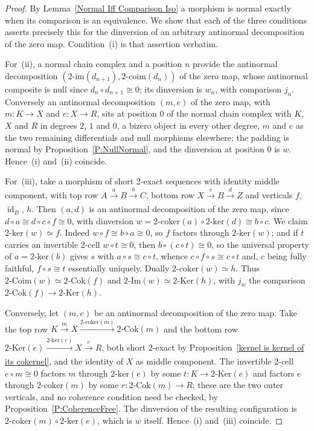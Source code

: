 \documentclass[reqno,a4paper]{amsart}
\numberwithin{equation}{section}
\theoremstyle{plain}
\theoremstyle{definition}
\def\nameit#1{\textrm{#1}~}
\def\prox{\nameit{Proposition}}
\def\lemx{\nameit{Lemma}}
\newcommand{\comp}{\circ}
\newcommand{\iso}{\cong}
\renewcommand{\1}{\onecat{1}}
\newcommand{\TwoKer}{\ensuremath{2\text{-}\mathrm{Ker}}}
\newcommand{\TwoCoker}{\ensuremath{2\text{-}\mathrm{Cok}}}
\newcommand{\twoker}{\ensuremath{2\text{-}\mathrm{ker}}}
\newcommand{\twocoker}{\ensuremath{2\text{-}\mathrm{coker}}}
\newcommand{\TwoImg}{\ensuremath{2\text{-}\mathrm{Im}}}
\newcommand{\twoimg}{\ensuremath{2\text{-}\mathrm{im}}}
\newcommand{\TwoCoim}{\ensuremath{2\text{-}\mathrm{Coim}}}
\newcommand{\twocoim}{\ensuremath{2\text{-}\mathrm{coim}}}
\newcommand{\id}[1]{\operatorname{id}_{#1}}
\newcommand{\aar}[2][]{\xrightarrow[#1]{#2}}
\begin{document}
\begin{proof}
	By \lemx\ref{Normal Iff Comparison Iso} a morphism is normal exactly when its comparison is an equivalence. We show that each of the three conditions asserts precisely this for the dinversion of an arbitrary antinormal decomposition of the zero map. Condition~(i) is that assertion verbatim.

	For~(ii), a normal chain complex and a position \(n\) provide the antinormal decomposition \((\twoimg(d_{n+1}),\twocoim(d_n))\) of the zero map, whose antinormal composite is null since \(d_n\comp d_{n+1}\iso 0\); its dinversion is \(w_n\), with comparison \(j_n\). Conversely an antinormal decomposition \((m,e)\) of the zero map, with \(m\colon K\to X\) and \(e\colon X\to R\), sits at position \(0\) of the normal chain complex with \(K\), \(X\) and \(R\) in degrees \(2\), \(1\) and \(0\), a bizero object in every other degree, \(m\) and \(e\) as the two remaining differentials and null morphisms elsewhere; the padding is normal by \prox\ref{P:NullNormal}, and the dinversion at position \(0\) is \(w\). Hence~(i) and~(ii) coincide.

	For~(iii), take a morphism of short 2-exact sequences with identity middle component, with top row \(A\aar{a}B\aar{b}C\), bottom row \(X\aar{c}B\aar{d}Z\) and verticals \(f\), \(\id{B}\), \(h\). Then \((a,d)\) is an antinormal decomposition of the zero map, since \(d\comp a\iso d\comp c\comp f\iso 0\), with dinversion \(w=\twocoker(a)\comp\twoker(d)\iso b\comp c\). We claim \(\twoker(w)\simeq f\). Indeed \(w\comp f\iso b\comp a\iso 0\), so \(f\) factors through \(\twoker(w)\); and if \(t\) carries an invertible 2-cell \(w\comp t\iso 0\), then \(b\comp(c\comp t)\iso 0\), so the universal property of \(a=\twoker(b)\) gives \(s\) with \(a\comp s\iso c\comp t\), whence \(c\comp f\comp s\iso c\comp t\) and, \(c\) being fully faithful, \(f\comp s\iso t\) essentially uniquely. Dually \(\twocoker(w)\simeq h\). Thus \(\TwoCoim(w)\simeq\TwoCoker(f)\) and \(\TwoImg(w)\simeq\TwoKer(h)\), with \(j_w\) the comparison \(\TwoCoker(f)\to\TwoKer(h)\).

	Conversely, let \((m,e)\) be an antinormal decomposition of the zero map. Take the top row \(K\aar{m}X\aar{\twocoker(m)}\TwoCoker(m)\) and the bottom row \(\TwoKer(e)\aar{\twoker(e)}X\aar{e}R\), both short 2-exact by \prox\ref{kernel is kernel of its cokernel}, and the identity of \(X\) as middle component. The invertible 2-cell \(e\comp m\iso 0\) factors \(m\) through \(\twoker(e)\) by some \(t\colon K\to\TwoKer(e)\) and factors \(e\) through \(\twocoker(m)\) by some \(r\colon\TwoCoker(m)\to R\); these are the two outer verticals, and no coherence condition need be checked, by \prox\ref{P:CoherenceFree}. The dinversion of the resulting configuration is \(\twocoker(m)\comp\twoker(e)\), which is \(w\) itself. Hence~(i) and~(iii) coincide.
\end{proof}
\end{document}
